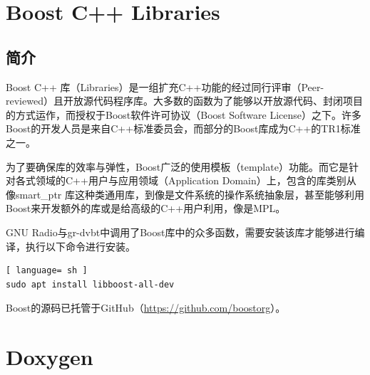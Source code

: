 	\section{Boost C++ Libraries}
		\subsection{简介}
			\par Boost C++ 库（Libraries）是一组扩充C++功能的经过同行评审（Peer-reviewed）且开放源代码程序库。大多数的函数为了能够以开放源代码、封闭项目的方式运作，而授权于Boost软件许可协议（Boost Software License）之下。许多Boost的开发人员是来自C++标准委员会，而部分的Boost库成为C++的TR1标准之一。
			\par 为了要确保库的效率与弹性，Boost广泛的使用模板（template）功能。而它是针对各式领域的C++用户与应用领域（Application Domain）上，包含的库类别从像smart\_ptr 库这种类通用库，到像是文件系统的操作系统抽象层，甚至能够利用Boost来开发额外的库或是给高级的C++用户利用，像是MPL。\cite{ wiki:Boost}
			\par GNU Radio与gr-dvbt中调用了Boost库中的众多函数，需要安装该库才能够进行编译，执行以下命令进行安装。
			\begin{lstlisting}[ language= sh ]
sudo apt install libboost-all-dev
			\end{lstlisting}
			\par Boost的源码已托管于GitHub（\href{https://github.com/boostorg}{https://github.com/boostorg}）。
	\section{Doxygen}
